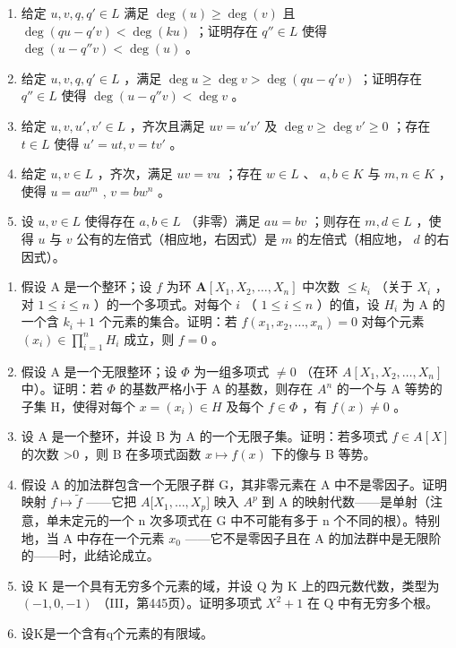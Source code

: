 \begin{enumerate}
\def\labelenumi{\alph{enumi})}
\setcounter{enumi}{1}
\item
  给定 \(u, v, q, q' \in L\) 满足 \(\deg(u) \geqslant \deg(v)\) 且 \(\deg(qu - q'v) < \deg(ku)\) ；证明存在 \(q'' \in L\) 使得 \(\deg(u - q''v) < \deg(u)\) 。
\item
  给定 \(u, v, q, q' \in L\) ，满足 \(\deg u \geqslant \deg v > \deg (qu - q'v)\) ；证明存在 \(q'' \in L\) 使得 \(\deg (u - q''v) < \deg v\) 。
\item
  给定 \(u, v, u', v' \in L\) ，齐次且满足 \(uv = u'v'\) 及 \(\deg v \geqslant \deg v' \geqslant 0\) ；存在 \(t \in L\) 使得 \(u' = ut, v = tv'\) 。
\item
  给定 \(u, v \in L\) ，齐次，满足 \(uv = vu\) ；存在 \(w \in L\) 、 \(a, b \in K\) 与 \(m, n \in K\) ，使得 \(u = aw^m\) , \(v = bw^n\) 。
\item
  设 \(u, v \in L\) 使得存在 \(a, b \in L\) （非零）满足 \(au = bv\) ；则存在 \(m, d \in L\) ，使得 \(u\) 与 \(v\) 公有的左倍式（相应地，右因式）是 \(m\) 的左倍式（相应地， \(d\) 的右因式）。
\end{enumerate}

\BourbakiExerciseGroup

\begin{enumerate}
\def\labelenumi{\arabic{enumi})}
\item
  假设 A 是一个整环；设 \(f\) 为环 \(\mathbf{A}[X_1, X_2, \ldots, X_n]\) 中次数 \(\leqslant k_i\) （关于 \(X_i\) ，对 \(1 \leqslant i \leqslant n\) ）的一个多项式。对每个 \(i\) （ \(1 \leqslant i \leqslant n\) ）的值，设 \(H_i\) 为 A 的一个含 \(k_i + 1\) 个元素的集合。证明：若 \(f(x_1, x_2, \ldots, x_n) = 0\) 对每个元素 \((x_i) \in \prod_{i=1}^{n} H_i\) 成立，则 \(f = 0\) 。
\item
  假设 A 是一个无限整环；设 \(\Phi\) 为一组多项式 \(\neq0\) （在环 \(A[X_{1},X_{2},\ldots,X_{n}]\) 中）。证明：若 \(\Phi\) 的基数严格小于 A 的基数，则存在 \(A^{n}\) 的一个与 A 等势的子集 H，使得对每个 \(x=(x_{i})\in H\) 及每个 \(f\in\Phi\) ，有 \(f(x)\neq0\) 。
\item
  设 A 是一个整环，并设 B 为 A 的一个无限子集。证明：若多项式 \(f \in A[X]\) 的次数 \textgreater0 ，则 B 在多项式函数 \(x \mapsto f(x)\) 下的像与 B 等势。
\item
  假设 A 的加法群包含一个无限子群 G，其非零元素在 A 中不是零因子。证明映射 \(f \mapsto \tilde{f}\) ——它把 \(A{[}X_{1}, \ldots, X_{p}{]}\) 映入 \(A^{p}\) 到 A 的映射代数——是单射（注意，单未定元的一个 n 次多项式在 G 中不可能有多于 n 个不同的根）。特别地，当 A 中存在一个元素 \(x_{0}\) ——它不是零因子且在 A 的加法群中是无限阶的——时，此结论成立。
\item
  设 K 是一个具有无穷多个元素的域，并设 Q 为 K 上的四元数代数，类型为 \((-1,0,-1)\) （III，第445页）。证明多项式 \(X^{2}+1\) 在 Q 中有无穷多个根。
\item
  设K是一个含有q个元素的有限域。
\end{enumerate}

